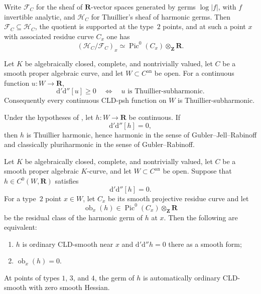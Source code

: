 
\begin{remark}
\label{rem:ch08-harmonic-vs-log}
Write $\mathcal F_C$ for the sheaf of $\mathbf R$-vector spaces generated
by germs $\log|f|$, with $f$ invertible analytic, and $\mathcal H_C$ for
Thuillier's sheaf of harmonic germs.  Then
$\mathcal F_C\subseteq\mathcal H_C$, the quotient is supported at the
type~$2$ points, and at such a point $x$ with associated residue curve
$C_x$ one has
\[
 (\mathcal H_C/\mathcal F_C)_x
 \simeq\operatorname{Pic}^0(C_x)\otimes_{\mathbf Z}\mathbf R.
\]
\end{remark}

\begin{theorem}
\label{thm:wanner-curve-comparison}
Let $K$ be algebraically closed, complete, and nontrivially valued, let
$C$ be a smooth proper algebraic curve, and let $W\subset C^{\mathrm{an}}$
be open.  For a continuous function $u:W\to\mathbf R$,
\[
                  \mathrm d'\mathrm d''[u]\geq0
        \quad\Longleftrightarrow\quad
                  u\text{ is Thuillier-subharmonic}.
\]
Consequently every continuous CLD-psh function on $W$ is
Thuillier-subharmonic.
\end{theorem}

\begin{corollary}
\label{cor:ch19-continuous-zero-current-harmonic}
Under the hypotheses of , let
$h:W\to\mathbf R$ be continuous.  If
\[
                         \mathrm d'\mathrm d''[h]=0,
\]
then $h$ is Thuillier harmonic, hence harmonic in the sense of
Gubler--Jell--Rabinoff and classically pluriharmonic in the sense of
Gubler--Rabinoff.
\end{corollary}

\begin{proposition}
\label{prop:p213-residual-picard-smooth-curve}
Let $K$ be algebraically closed, complete, and nontrivially valued, let
$C$ be a smooth proper algebraic $K$-curve, and let
$W\subset C^{\mathrm{an}}$ be open.  Suppose that
$h\in C^0(W,\mathbf R)$ satisfies
\[
                         \mathrm d'\mathrm d''[h]=0.
\]
For a type~$2$ point $x\in W$, let $C_x$ be its smooth projective residue
curve and let
\[
 \operatorname{ob}_x(h)\in
 \operatorname{Pic}^0(C_x)\otimes_{\mathbf Z}\mathbf R
\]
be the residual class of the harmonic germ of $h$ at $x$.  Then the
following are equivalent:
\begin{enumerate}
\item $h$ is ordinary CLD-smooth near $x$ and
      $\mathrm d'\mathrm d''h=0$ there as a smooth form;
\item $\operatorname{ob}_x(h)=0$.
\end{enumerate}
At points of types $1$, $3$, and $4$, the germ of $h$ is automatically
ordinary CLD-smooth with zero smooth Hessian.
\end{proposition}

